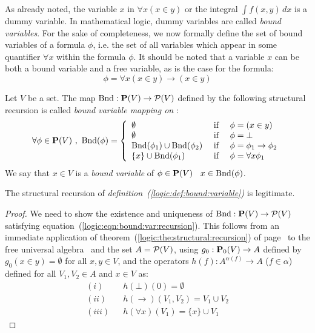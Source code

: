 As already noted, the variable $x$ in $\forall x(x\in y)$ or the
integral $\int\! f(x,y)\,dx$ is a dummy variable. In mathematical
logic, dummy variables are called {\em bound variables}. For the
sake of completeness, we now formally define the set of bound
variables of a formula $\phi$, i.e. the set of all variables which
appear in some quantifier $\forall x$ within the formula $\phi$. It
should be noted that a variable $x$ can be both a bound variable and
a free variable, as is the case for the formula:
    \[
    \phi=\forall x(x\in y)\to (x\in y)
    \]
\begin{defin}\label{logic:def:bound:variable}
Let $V$ be a set. The map $\mbox{\rm Bnd}:\mbox{${\bf P}(V)$}\to {\cal P}(V)$ defined by the
following structural recursion is called {\em bound variable mapping
on \pv}:
 \begin{equation}\label{logic:eqn:bound:var:recursion}
    \forall\phi\in\pv\ ,\ \bound(\phi)=\left\{
                    \begin{array}{lcl}
                    \emptyset&\mbox{\ if\ }&\phi=(x\in y)\\
                    \emptyset&\mbox{\ if\ }&\phi=\bot\\
                    \bound(\phi_{1})\cup\bound(\phi_{2}) &\mbox{\ if\ }&\phi=\phi_{1}\to\phi_{2}\\
                    \{x\}\cup\bound(\phi_{1})&\mbox{\ if\ }&\phi=\forall x\phi_{1}
                    \end{array}\right.
    \end{equation}
We say that $x\in V$ is a {\em bound variable} of $\phi\in\mbox{${\bf P}(V)$}$
\ifand\ $x\in\mbox{\rm Bnd}(\phi)$.
\end{defin}
\begin{prop}\label{logic:prop:bound:variable}
The structural recursion of {\em
definition~(\ref{logic:def:bound:variable})} is legitimate.
\end{prop}
\begin{proof}
We need to show the existence and uniqueness of $\mbox{\rm Bnd}:\mbox{${\bf P}(V)$}\to{\cal
P}(V)$ satisfying equation~(\ref{logic:eqn:bound:var:recursion}).
This follows from an immediate application of
theorem~(\ref{logic:the:structural:recursion}) of
page~\pageref{logic:the:structural:recursion} to the free universal
algebra \pv\ and the set $A={\cal P}(V)$, using $g_{0}:\mbox{${\bf P}_{0}(V)$}\to A$
defined by $g_{0}(x\in y)=\emptyset$ for all $x,y\in V$, and the
operators $h(f):A^{\alpha(f)}\to A$ ($f\in\alpha$) defined for all
$V_{1},V_{2}\in A$ and $x\in V$ as:
    \begin{eqnarray*}
    (i)&&h(\bot)(0)=\emptyset\\
    (ii)&&h(\to)(V_{1},V_{2})=V_{1}\cup V_{2}\\
    (iii)&&h(\forall x)(V_{1})=\{x\}\cup V_{1}
    \end{eqnarray*}
\end{proof}


